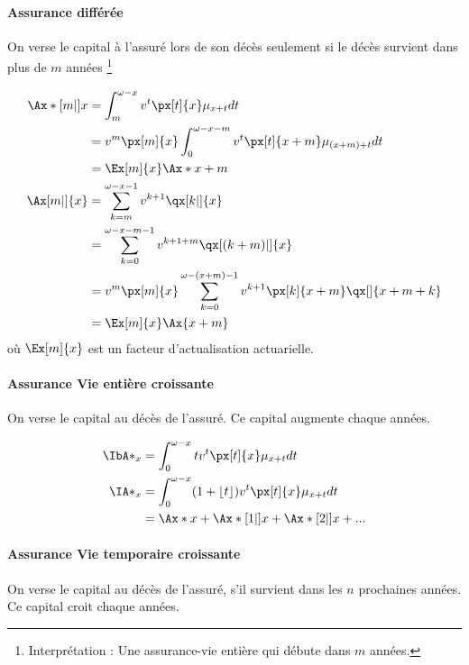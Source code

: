 \documentclass[10pt, french]{article}
\begin{document}
\begin{multicols*}{3}
\paragraph{Assurance différée} On verse le capital à l'assuré lors de son décès seulement si le décès survient dans plus de $m$ années \footnote{Interprétation : Une assurance-vie entière qui débute dans $m$ années.}

\begin{align*}
\Ax*[m|]{x}	& = \int_{m}^{\omega -x} v^t \px[t]{x} \mu_{x+t} dt \\
	& = v^m \px[m]{x} \int_{0}^{\omega - x - m} v^t \px[t]{x+m} \mu_{(x+m)+t} dt \\
	& = \Ex[m]{x} \Ax*{x+m} \\
\Ax[m|]{x}	& = \sum_{k=m}^{\omega - x -1} v^{k+1} \qx[k|]{x} \\
	& = \sum_{k=0}^{\omega - x - m - 1} v^{k+1+m} \qx[(k+m)|]{x} \\
	& = v^m \px[m]{x} \sum_{k=0}^{\omega - (x+m) - 1} v^{k+1} \px[k]{x+m} \qx[]{x+m+k} \\
	& = \Ex[m]{x} \Ax{x+m} \\
\end{align*}
où $\Ex[m]{x}$ est un facteur d'actualisation actuarielle.

\paragraph{Assurance Vie entière croissante} On verse le capital au décès de l'assuré. Ce capital augmente chaque années.

\begin{align*}
	\IbA*_x &= \int_0^{\omega - x} t v^t \px[t]{x} \mu_{x+t} dt \\
	\IA*_{x} &= \int_0^{\omega - x} (1 + \lfloor t \rfloor) v^t \px[t]{x} \mu_{x+t} dt \\
		&= \Ax*{x} + \Ax*[1|]{x} + \Ax*[2|]{x} + ...
\end{align*}

\paragraph{Assurance Vie temporaire croissante} On verse le capital au décès de l'assuré, s'il survient dans les $n$ prochaines années. Ce capital croit chaque années.


\end{multicols*}
\end{document}
